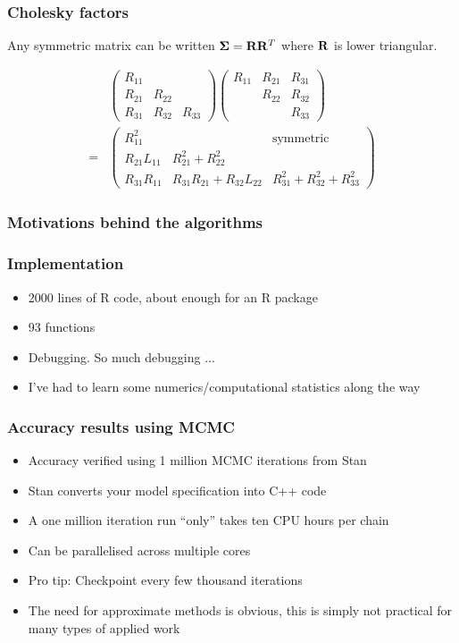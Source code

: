 \documentclass{beamer}
\begin{document}
\begin{frame}
\frametitle{Cholesky factors}
Any symmetric matrix can be written ${\boldsymbol \Sigma} = {\bf R} {\bf R}^T$
where ${\bf R}$ is lower triangular.

\begin{align*}
&\begin{pmatrix}
R_{11} \\
R_{21} & R_{22} \\
R_{31} & R_{32} & R_{33}
\end{pmatrix}
\begin{pmatrix}
R_{11} & R_{21} & R_{31} \\
& R_{22} & R_{32} \\
& & R_{33}
\end{pmatrix}
\\
=& \begin{pmatrix}
R_{11}^2 & & \text{symmetric}\\
R_{21}L_{11} & R_{21}^2 + R_{22}^2 \\
R_{31} R_{11} & R_{31}R_{21} + R_{32}L_{22} & R_{31}^2 + R_{32} ^2 + R_{33}^2
\end{pmatrix}
\end{align*}
\end{frame}

\begin{frame}
\frametitle{Motivations behind the algorithms}
\end{frame}

\begin{frame}
\frametitle{Implementation}
\begin{itemize}
\item 2000 lines of R code, about enough for an R package
\item 93 functions
\item Debugging. So much debugging ...
\item I've had to learn some numerics/computational statistics along the
way
\end{itemize}
\end{frame}

\begin{frame}
\frametitle{Accuracy results using MCMC}
\begin{itemize}
\item Accuracy verified using 1 million MCMC iterations from Stan
\item Stan converts your model specification into C++ code
\item A one million iteration run ``only'' takes ten CPU hours per chain
\item Can be parallelised across multiple cores
\item Pro tip: Checkpoint every few thousand iterations
\item The need for approximate methods is obvious, this is simply not
practical for many types of applied work
\end{itemize}
\end{frame}
\end{document}
